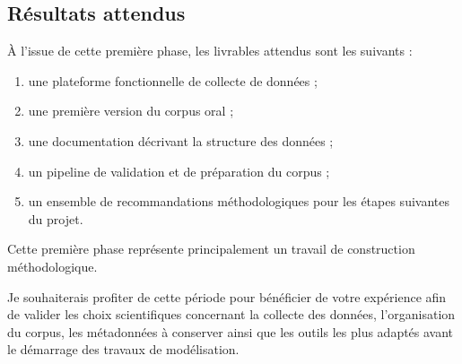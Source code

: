 
\subsection{Résultats attendus}

À l'issue de cette première phase, les livrables attendus sont les
suivants :

\begin{enumerate}

\item une plateforme fonctionnelle de collecte de données ;

\item une première version du corpus oral ;

\item une documentation décrivant la structure des données ;

\item un pipeline de validation et de préparation du corpus ;

\item un ensemble de recommandations méthodologiques pour les étapes
suivantes du projet.

\end{enumerate}


\begin{discussion}

Cette première phase représente principalement un travail de
construction méthodologique.

Je souhaiterais profiter de cette période pour bénéficier de votre
expérience afin de valider les choix scientifiques concernant la
collecte des données, l'organisation du corpus, les métadonnées à
conserver ainsi que les outils les plus adaptés avant le démarrage des
travaux de modélisation.

\end{discussion}